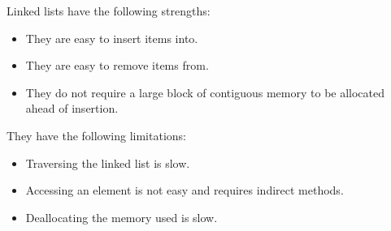 Linked lists have the following strengths:
\begin{itemize}
  \item They are easy to insert items into.
  \item They are easy to remove items from.
  \item They do not require a large block of contiguous memory to be allocated
    ahead of insertion.
\end{itemize}
They have the following limitations:
\begin{itemize}
  \item Traversing the linked list is slow.
  \item Accessing an element is not easy and requires indirect methods.
  \item Deallocating the memory used is slow.
\end{itemize}
